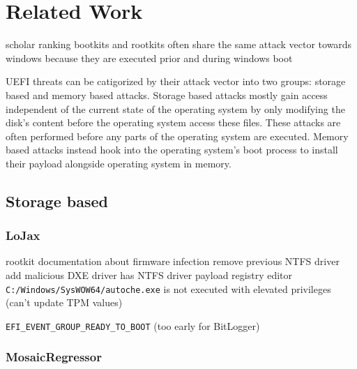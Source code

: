 
\chapter{Related Work}


scholar ranking
bootkits and rootkits often share the same attack vector towards windows because they are executed prior and during windows boot

UEFI threats can be catigorized by their attack vector into two groups: storage based and memory based attacks. Storage based attacks mostly gain access independent of the current state of the operating system by only modifying the disk's content before the operating system access these files. These attacks are often performed before any parts of the operating system are executed. Memory based attacks instead hook into the operating system's boot process to install their payload alongside operating system in memory.

\section{Storage based}


\subsection{LoJax}


rootkit
documentation about firmware infection
remove previous NTFS driver
add malicious DXE driver
has NTFS driver
payload
registry editor
\lstinline{C:/Windows/SysWOW64/autoche.exe} is not executed with elevated privileges (can't update TPM values)

\lstinline{EFI_EVENT_GROUP_READY_TO_BOOT} (too early for BitLogger)


\subsection{MosaicRegressor}

